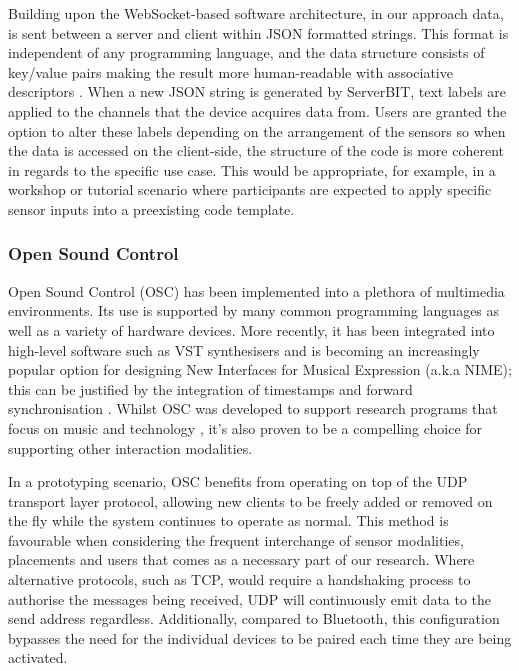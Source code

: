 Building upon the WebSocket-based software architecture, in our approach data, is sent between a server and client within JSON formatted strings. This format is independent of any programming language, and the data structure consists of key/value pairs making the result more human-readable with associative descriptors \cite{marrs_json_2017}. When a new JSON string is generated by ServerBIT, text labels are applied to the channels that the device acquires data from. Users are granted the option to alter these labels depending on the arrangement of the sensors so when the data is accessed on the client-side, the structure of the code is more coherent in regards to the specific use case. This would be appropriate, for example, in a workshop or tutorial scenario where participants are expected to apply specific sensor inputs into a preexisting code template.

\subsubsection*{Open Sound Control}

Open Sound Control (OSC) has been implemented into a plethora of multimedia environments. Its use is supported by many common programming languages as well as a variety of hardware devices. More recently, it has been integrated into high-level software such as VST synthesisers and is becoming an increasingly popular option for designing New Interfaces for Musical Expression (a.k.a NIME); this can be justified by the integration of timestamps and forward synchronisation \cite{schmeder_best_2010}. Whilst OSC was developed to support research programs that focus on music and technology \cite{freed_features_2009}, it’s also proven to be a compelling choice for supporting other interaction modalities.

In a prototyping scenario, OSC benefits from operating on top of the UDP transport layer protocol, allowing new clients to be freely added or removed on the fly while the system continues to operate as normal. This method is favourable when considering the frequent interchange of sensor modalities, placements and users that comes as a necessary part of our research. Where alternative protocols, such as TCP, would require a handshaking process to authorise the messages being received, UDP will continuously emit data to the send address regardless. Additionally, compared to Bluetooth, this configuration bypasses the need for the individual devices to be paired each time they are being activated.

